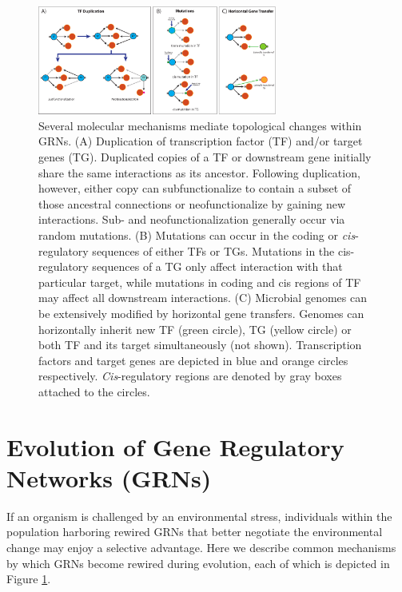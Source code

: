 \begin{figure}[h!]
    \centering
    \includegraphics[width=0.7\textwidth]{figures/review_figure2}
 	\caption[Evolution of gene regulatory networks]{
 	Several molecular mechanisms mediate topological changes within GRNs. (A) Duplication of transcription factor (TF) and/or target genes (TG). Duplicated copies of a TF or downstream gene initially share the same interactions as its ancestor. Following duplication, however, either copy can subfunctionalize to contain a subset of those ancestral connections or neofunctionalize by gaining new interactions. Sub- and neofunctionalization generally occur via random mutations. (B) Mutations can occur in the coding or \textit{cis}-regulatory sequences of either TFs or TGs. Mutations in the cis-regulatory sequences of a TG only affect interaction with that particular target, while mutations in coding and cis regions of TF may affect all downstream interactions. (C) Microbial genomes can be extensively modified by horizontal gene transfers. Genomes can horizontally inherit new TF (green circle), TG (yellow circle) or both TF and its target simultaneously (not shown). Transcription factors and target genes are depicted in blue and orange circles respectively. \textit{Cis}-regulatory regions are denoted by gray boxes attached to the circles.
}
    \label{fig:chap4:evoGRN}
\end{figure}   

\section{Evolution of Gene Regulatory Networks (GRNs)}

If an organism is challenged by an environmental stress, individuals within the population harboring rewired GRNs that better negotiate the environmental change may enjoy a selective advantage. Here we describe common mechanisms by which GRNs become rewired during evolution, each of which is depicted in Figure \ref{fig:chap4:evoGRN}.   


